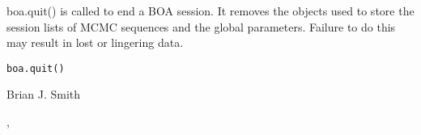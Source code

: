 \begin{Description}\relax
boa.quit() is called to end a BOA session. It removes the objects used to 
store the session lists of MCMC sequences and the global parameters. 
Failure to do this may result in lost or lingering data.
\end{Description}
\begin{Usage}
\begin{verbatim}
boa.quit()
\end{verbatim}
\end{Usage}
\begin{Author}\relax
Brian J. Smith
\end{Author}
\begin{SeeAlso}\relax
{}, 
\end{SeeAlso}

